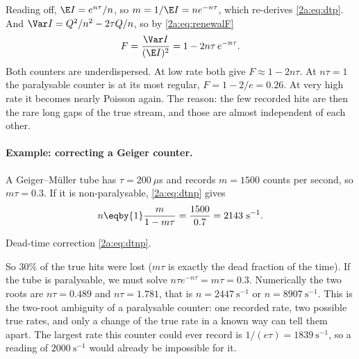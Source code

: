Reading off, $\E I=e^{n\tau}/n$, so $m=1/\E I=ne^{-n\tau}$, which re-derives \eqref{2a:eq:dtp}. And $\Var I=Q^2/n^2-2\tau Q/n$, so by \eqref{2a:eq:renewalF}
\begin{equation}
  F=\frac{\Var I}{(\E I)^2}=1-2n\tau\,e^{-n\tau}. \label{2a:eq:dtpF}
\end{equation}
Both counters are underdispersed. At low rate both give $F\approx1-2n\tau$. At $n\tau=1$ the paralysable counter is at its most regular, $F=1-2/e=0.26$. At very high rate it becomes nearly Poisson again. The reason: the few recorded hits are then the rare long gaps of the true stream, and those are almost independent of each other.

\paragraph{Example: correcting a Geiger counter.} A Geiger--M\"uller tube has $\tau=200~\mu$s and records $m=1500$ counts per second, so $m\tau=0.3$. If it is non-paralysable, \eqref{2a:eq:dtnp} gives
\begin{align*}
  n \eqby{1} \frac{m}{1-m\tau} = \frac{1500}{0.7} = 2143~\text{s}^{-1} .
\end{align*}
\begin{explain}
  \item Dead-time correction \eqref{2a:eq:dtnp}.
\end{explain}
So $30\%$ of the true hits were lost ($m\tau$ is exactly the dead fraction of the time). If the tube is paralysable, we must solve $n\tau e^{-n\tau}=m\tau=0.3$. Numerically the two roots are $n\tau=0.489$ and $n\tau=1.781$, that is $n=2447~\text{s}^{-1}$ or $n=8907~\text{s}^{-1}$. This is the two-root ambiguity of a paralysable counter: one recorded rate, two possible true rates, and only a change of the true rate in a known way can tell them apart. The largest rate this counter could ever record is $1/(e\tau)=1839~\text{s}^{-1}$, so a reading of $2000~\text{s}^{-1}$ would already be impossible for it.

